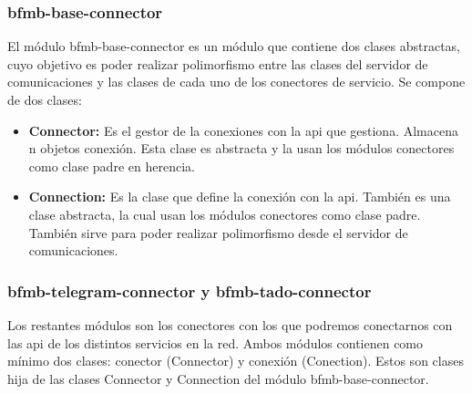 \documentclass[spanish,12pt, a4paper, twoside]{paper}
\begin{document}
\subsubsection{bfmb-base-connector}

El módulo bfmb-base-connector es un módulo que contiene dos clases abstractas, cuyo objetivo es poder realizar polimorfismo entre las clases del servidor de comunicaciones y las clases de cada uno de los conectores de servicio. Se compone de dos clases:

\begin{itemize}
\item\textbf{Connector:} Es el gestor de la conexiones con la api que gestiona. Almacena n objetos conexión. Esta clase es abstracta y la usan los módulos conectores como clase padre en herencia.
\item\textbf{Connection:} Es la clase que define la conexión con la api. También es una clase abstracta, la cual usan los módulos conectores como clase padre. También sirve para poder realizar polimorfismo desde el servidor de comunicaciones.
\end{itemize}

\subsubsection{bfmb-telegram-connector y bfmb-tado-connector}

Los restantes módulos son los conectores con los que podremos conectarnos con las api de los distintos servicios en la red. Ambos módulos contienen como mínimo dos clases: conector (Connector) y conexión (Conection). Estos son clases hija de las clases Connector y Connection del módulo bfmb-base-connector.
\end{document}
